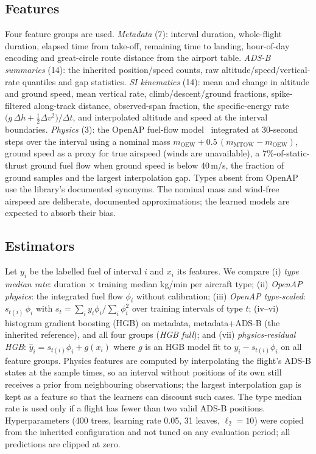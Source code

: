 \documentclass[runningheads]{llncs}
\begin{document}
\subsection{Features}\label{sec:features}
Four feature groups are used. \emph{Metadata} (7): interval duration, whole-flight duration, elapsed time from take-off, remaining time to landing, hour-of-day encoding and great-circle route distance from the airport table. \emph{ADS-B summaries} (14): the inherited position/speed counts, raw altitude/speed/vertical-rate quantiles and gap statistics. \emph{SI kinematics} (14): mean and change in altitude and ground speed, mean vertical rate, climb/descent/ground fractions, spike-filtered along-track distance, observed-span fraction, the specific-energy rate $\big(g\,\Delta h + \tfrac12\Delta v^2\big)/\Delta t$, and interpolated altitude and speed at the interval boundaries. \emph{Physics} (3): the OpenAP fuel-flow model~\cite{sun2020openap} integrated at 30-second steps over the interval using a nominal mass $m_{\mathrm{OEW}} + 0.5\,(m_{\mathrm{MTOW}}-m_{\mathrm{OEW}})$, ground speed as a proxy for true airspeed (winds are unavailable), a 7\%-of-static-thrust ground fuel flow when ground speed is below 40\,m/s, the fraction of ground samples and the largest interpolation gap. Types absent from OpenAP use the library's documented synonyms. The nominal mass and wind-free airspeed are deliberate, documented approximations; the learned models are expected to absorb their bias.

\subsection{Estimators}
Let $y_i$ be the labelled fuel of interval $i$ and $x_i$ its features. We compare
(i) \emph{type median rate}: duration $\times$ training median kg/min per aircraft type;
(ii) \emph{OpenAP physics}: the integrated fuel flow $\phi_i$ without calibration;
(iii) \emph{OpenAP type-scaled}: $s_{t(i)}\,\phi_i$ with $s_t=\sum_i y_i\phi_i/\sum_i\phi_i^2$ over training intervals of type $t$;
(iv--vi) histogram gradient boosting (HGB) on metadata, metadata+ADS-B (the inherited reference), and all four groups (\emph{HGB full}); and
(vii) \emph{physics-residual HGB}: $\hat y_i = s_{t(i)}\phi_i + g(x_i)$ where $g$ is an HGB model fit to $y_i - s_{t(i)}\phi_i$ on all feature groups.
Physics features are computed by interpolating the flight's ADS-B states at the sample times, so an interval without positions of its own still receives a prior from neighbouring observations; the largest interpolation gap is kept as a feature so that the learners can discount such cases. The type median rate is used only if a flight has fewer than two valid ADS-B positions. Hyperparameters (400 trees, learning rate 0.05, 31 leaves, $\ell_2=10$) were copied from the inherited configuration and not tuned on any evaluation period; all predictions are clipped at zero.
\end{document}
